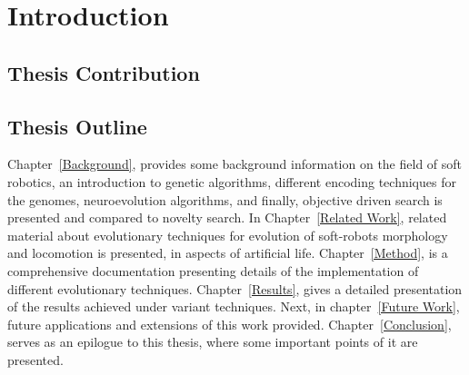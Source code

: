 
\chapter{Introduction} %

\label{Chapter1} %



\section{Thesis Contribution}



\section{Thesis Outline}

Chapter~\ref{Background}, provides some background information on the field of soft robotics, an introduction to genetic algorithms, different encoding techniques for the genomes, neuroevolution algorithms, and finally, objective driven search is presented and compared to novelty search. In Chapter~\ref{Related Work}, related material about evolutionary techniques for evolution of soft-robots morphology and locomotion is presented, in aspects of artificial life. Chapter~\ref{Method}, is a comprehensive documentation presenting details of the implementation of different evolutionary techniques. Chapter~\ref{Results}, gives a detailed presentation of the results achieved under variant techniques. Next, in chapter~\ref{Future Work}, future applications and extensions of this work provided. Chapter~\ref{Conclusion}, serves as an epilogue to this thesis, where some important points of it are presented.